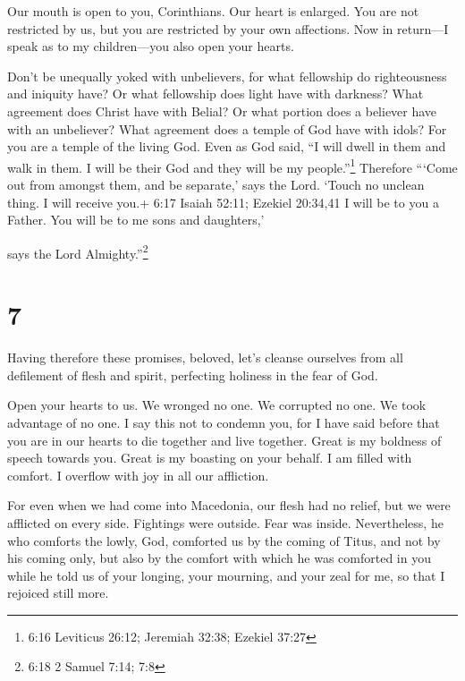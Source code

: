  Our mouth is open to you, Corinthians. Our heart is
enlarged.  You are not restricted by us, but you are
restricted by your own affections.  Now in return---I speak
as to my children---you also open your hearts.

 Don't be unequally yoked with unbelievers, for what
fellowship do righteousness and iniquity have? Or what fellowship does
light have with darkness?  What agreement does Christ have
with Belial? Or what portion does a believer have with an unbeliever?
 What agreement does a temple of God have with idols? For
you are a temple of the living God. Even as God said, ``I will dwell in
them and walk in them. I will be their God and they will be my
people.''\footnote{6:16 Leviticus 26:12; Jeremiah 32:38; Ezekiel 37:27}
 Therefore ```Come out from amongst them, and be separate,'
says the Lord. `Touch no unclean thing. I will receive you.+ 6:17 Isaiah
52:11; Ezekiel 20:34,41  I will be to you a Father. You
will be to me sons and daughters,'

says the Lord Almighty.''\footnote{6:18 2 Samuel 7:14; 7:8}

\hypertarget{section-6}{%
\section{7}\label{section-6}}

 Having therefore these promises, beloved, let's cleanse
ourselves from all defilement of flesh and spirit, perfecting holiness
in the fear of God.

 Open your hearts to us. We wronged no one. We corrupted no
one. We took advantage of no one.  I say this not to condemn
you, for I have said before that you are in our hearts to die together
and live together.  Great is my boldness of speech towards
you. Great is my boasting on your behalf. I am filled with comfort. I
overflow with joy in all our affliction.

 For even when we had come into Macedonia, our flesh had no
relief, but we were afflicted on every side. Fightings were outside.
Fear was inside.  Nevertheless, he who comforts the lowly,
God, comforted us by the coming of Titus,  and not by his
coming only, but also by the comfort with which he was comforted in you
while he told us of your longing, your mourning, and your zeal for me,
so that I rejoiced still more.

